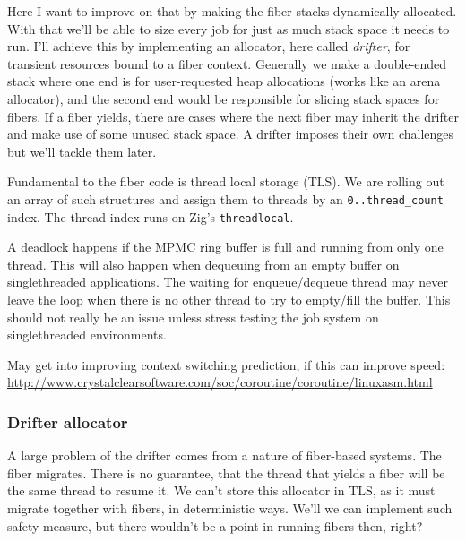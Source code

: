 Here I want to improve on that by making the fiber stacks dynamically allocated.
With that we'll be able to size every job for just as much stack space it needs to run.
I'll achieve this by implementing an allocator, here called \textit{drifter}, for transient resources bound to a fiber context.
Generally we make a double-ended stack where one end is for user-requested heap allocations (works like an arena allocator),
and the second end would be responsible for slicing stack spaces for fibers.
If a fiber yields, there are cases where the next fiber may inherit the drifter and make use of some unused stack space.
A drifter imposes their own challenges but we'll tackle them later.

Fundamental to the fiber code is thread local storage (TLS). 
We are rolling out an array of such structures and assign them to threads by an \texttt{0..thread\_count} index.
The thread index runs on Zig's \texttt{threadlocal}. 

A deadlock happens if the MPMC ring buffer is full and running from only one thread.
This will also happen when dequeuing from an empty buffer on singlethreaded applications.
The waiting for enqueue/dequeue thread may never leave the loop 
when there is no other thread to try to empty/fill the buffer. 
This should not really be an issue unless stress testing the job system on singlethreaded environments.

May get into improving context switching prediction, if this can improve speed:
\url{http://www.crystalclearsoftware.com/soc/coroutine/coroutine/linuxasm.html}

\subsubsection{Drifter allocator}
A large problem of the drifter comes from a nature of fiber-based systems. The fiber migrates.
There is no guarantee, that the thread that yields a fiber will be the same thread to resume it.
We can't store this allocator in TLS, as it must migrate together with fibers, in deterministic ways.
We'll we can implement such safety measure, but there wouldn't be a point in running fibers then, right?

